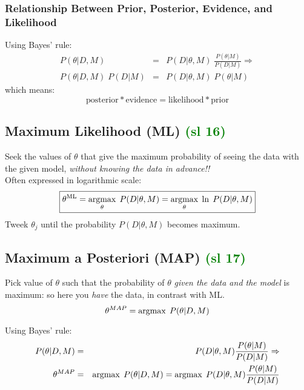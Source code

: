 \subsubsection{Relationship Between Prior, Posterior, Evidence, and Likelihood}

Using Bayes' rule:
\begin{eqnarray}
P(\theta|D,M) & = & P(D|\theta,M) \; \frac{P(\theta|M)}{P(D|M)} \Rightarrow 
\label{eq:posteriorbayes}
\\
P(\theta|D,M) \; P(D|M) & = & P(D|\theta,M)  \; P(\theta|M)
\end{eqnarray}
which means:
\begin{equation}
\text{posterior} * \text{evidence} = \text{likelihood} * \text{prior}
\label{eq:posteriorbayes0}
\end{equation}

\subsection{Maximum Likelihood (ML) \textcolor{green}{(sl 16)}}
\label{sec:maxlikelihood}

Seek the values of $\theta$ that give the maximum probability of seeing the data with the given model, {\em without knowing the data in advance!!} \\
Often expressed in logarithmic scale:
\begin{equation}
\boxed{\theta^{\text{ML}} = \argmax_\theta \; P(D|\theta,M)
                  = \argmax_\theta \; \ln \; P(D|\theta,M)}
\end{equation}
Tweek $\theta_j$ until the probability $P(D|\theta,M)$ becomes maximum.

\subsection{Maximum a Posteriori (MAP) \textcolor{green}{(sl 17)}}

Pick value of $\theta$ such that the probability of $\theta$ {\em given the data and the model} is maximum: so here you {\em have} the data, in contrast with ML.
\begin{equation}
\theta^{MAP} = \argmax \; P(\theta|D,M) 
\end{equation}

Using Bayes' rule:
\begin{eqnarray}
P(\theta|D,M) & = & P(D|\theta,M) \frac{P(\theta|M)}{P(D|M)} \Rightarrow
\\
\theta^{MAP} & = & \argmax \; P(\theta|D,M) 
            = \argmax \; P(D|\theta,M) \frac{P(\theta|M)}{P(D|M)}
\end{eqnarray}

